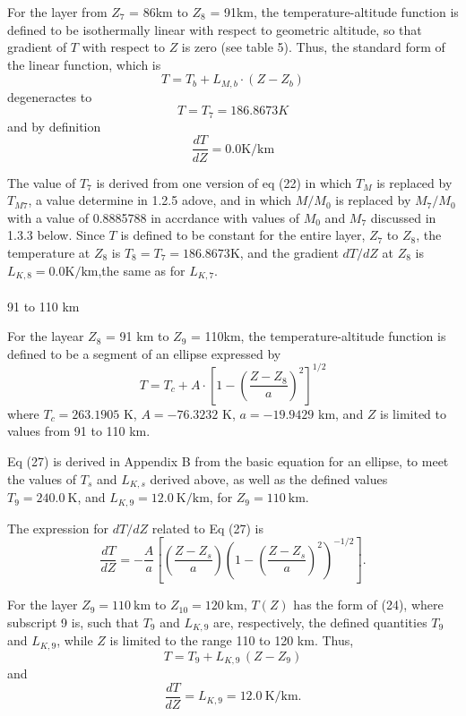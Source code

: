 \documentclass{article}
\begin{document}
For the layer from $Z_7$ = 86km to $Z_8$ = 91km, the temperature-altitude function is defined to be isothermally linear with respect to geometric altitude, so that gradient of $T$ with respect to $Z$ is zero (see table 5). Thus, the standard form of the linear function, which is
\begin{equation}
  T = T_b + L_{M,b}\cdot (Z - Z_b) 
  \tag{24}
\end{equation}
degeneractes to
\begin{equation}
  T= T_7 = 186.8673 K
  \tag{25}
\end{equation}
and by definition
\begin{equation}
  \frac{dT}{dZ} = 0.0 \text{K/km}
  \tag{26}
\end{equation}

The value of $T_7$ is derived from one version of eq (22) in which $T_M$ is replaced by $T_{M7}$, a value determine in 1.2.5 adove, and in which $M/M_0$ is replaced by $M_7/M_0$ with a value of 0.8885788 in accrdance with values of $M_0$ and $M_7$ discussed in 1.3.3 below. Since $T$ is defined to be constant for the entire layer, $Z_7$ to $Z_8$, the temperature at $Z_8$ is $T_8 = T_7 = 186.8673$K, and the gradient $dT/dZ$ at $Z_8$ is $L_{K,8} = 0.0\text{K/km}$,the same as for $L_{K,7}$.\\\\
91 to 110 km

For the layear $Z_8$ = 91 km to $Z_9$ = 110km, the temperature-altitude function is defined to be a segment of an ellipse expressed by
\begin{equation}
  T = T_c + A \cdot \left[ 1 - \left( \frac{Z - Z_8}{a} \right)^2 \right]^{1/2}
  \tag{27}
\end{equation}
where
$T_c = 263.1905$ K, $A = -76.3232$ K, $a = -19.9429$ km, and $Z$ is limited to values from 91 to 110 km.

Eq (27) is derived in Appendix B from the basic equation for an ellipse, to meet the values of \(T_s\) and \(L_{K,s}\) derived above, as well as the defined values \(T_9 = 240.0~\text{K}\), and \(L_{K,9} = 12.0~\text{K/km}\), for \(Z_9 = 110~\text{km}\).

The expression for \(dT/dZ\) related to Eq (27) is
\[
\frac{dT}{dZ} = -\frac{A}{a} \left[ \left(\frac{Z - Z_s}{a} \right) \left(1 - \left(\frac{Z - Z_s}{a} \right)^2 \right)^{-1/2} \right]. \tag{28}
\]

For the layer \(Z_9 = 110~\text{km}\) to \(Z_{10} = 120~\text{km}\), \(T(Z)\) has the form of (24), where subscript 9 is, such that \(T_9\) and \(L_{K,9}\) are, respectively, the defined quantities \(T_9\) and \(L_{K,9}\), while \(Z\) is limited to the range 110 to 120 km. Thus,
\[
T = T_9 + L_{K,9} \, (Z - Z_9) \tag{29}
\]
and
\[
\frac{dT}{dZ} = L_{K,9} = 12.0~\text{K/km}. \tag{30}
\]
\end{document}
